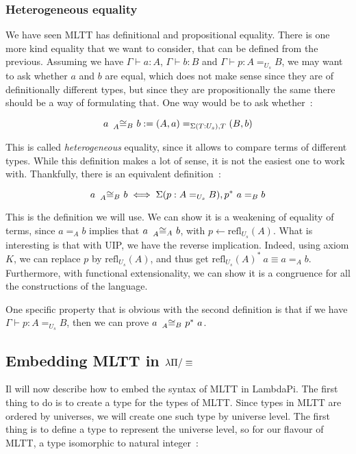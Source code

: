 \subsubsection{Heterogeneous equality}\label{heq}

We have seen MLTT has definitional and propositional equality. There is one more
kind equality that we want to consider, that can be defined from the previous.
Assuming we have $\Gamma\vdash a : A$, $\Gamma\vdash b : B$ and $\Gamma\vdash p : A =_{U_{s}} B$, we may want
to ask whether $a$ and $b$ are equal, which does not make sense since they are
of definitionally different types, but since they are propositionally the same
there should be a way of formulating that. One way would be to ask whether~:

\[ a ~\prescript{}{A}\cong_{B}~ b := (A,a) =_{\Sigma(T : U_{s}), T} (B,b) \]

This is called \emph{heterogeneous} equality, since it allows to compare terms
of different types. While this definition makes a lot of sense, it is not the
easiest one to work with. Thankfully, there is an equivalent definition~:

\[ a ~\prescript{}{A}\cong_{B}~ b \iff \Sigma(p : A =_{U_{s}} B), p^{*}\ a =_{B} b\]

This is the definition we will use. We can show it is a weakening of equality of
terms, since $a =_{A} b$ implies that $a ~\prescript{}{A}\cong_{A}~ b$, with
$p \leftarrow \text{refl}_{U_{s}}(A)$. What is interesting is that with UIP, we have the
reverse implication. Indeed, using axiom $K$, we can replace $p$ by
$\text{refl}_{U_{s}}(A)$, and thus get
$\text{refl}_{U_{s}}(A)^{*}\ a \equiv a =_{A} b$. Furthermore, with functional
extensionality, we can show it is a congruence for all the constructions of the
language.

One specific property that is obvious with the second definition is that if we
have $\Gamma\vdash p : A =_{U_{s}} B$, then we can prove $a \heq{A}{B} p^{*}\ a$.

\subsection{Embedding MLTT in $\lambda\Pi/\equiv$}\label{mltt-shallow}

Il will now describe how to embed the syntax of MLTT in LambdaPi. The first
thing to do is to create a type for the types of MLTT. Since types in MLTT are
ordered by universes, we will create one such type by universe level. The first
thing is to define a type to represent the universe level, so for our flavour of
MLTT, a type isomorphic to natural integer~:

